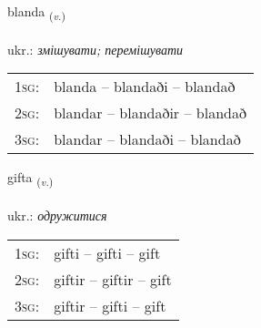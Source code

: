 \documentclass[frontgrid, backgrid]{flacards}\usepackage[]{graphicx}\usepackage[]{xcolor}
\begin{document}
\renewcommand{\blhead}{\vskip5pt {\small\bfseries\footnotesize Sagnorð | дієслово }}
\renewcommand{\bcfoot}{\vskip5pt \hspace{2pt}{\small\bfseries\footnotesize 2K}}


{blanda \small{\textsubscript{(\textit{v.})}} \\[1ex] %
\textphonetic{[planta]} \\
ukr.: \emph{змішувати; перемішувати} \\  [2ex]
\renewcommand*{\arraystretch}{0.8}
\begin{tabular}{p{1cm}l}
\textsc{1sg}: & blanda -- blandaði -- blandað \\ 
\textsc{2sg}: & blandar -- blandaðir -- blandað \\ 
\textsc{3sg}: & blandar -- blandaði -- blandað \\ 
\end{tabular}
}

\renewcommand{\flhead}{\vskip5pt \fboxsep=0pt {\small\bfseries\footnotesize Sagnorð | дієслово}}
\renewcommand{\fcfoot}{\vskip5pt \fboxsep=0pt \hspace{2pt}{\small\bfseries\footnotesize 2K}}

\renewcommand{\blhead}{\vskip5pt {\small\bfseries\footnotesize Sagnorð | дієслово }}
\renewcommand{\bcfoot}{\vskip5pt \hspace{2pt}{\small\bfseries\footnotesize 2K}}


{gifta \small{\textsubscript{(\textit{v.})}} \\[1ex] %
\textphonetic{[cɪfta]} \\
ukr.: \emph{одружитися} \\  [2ex]
\renewcommand*{\arraystretch}{0.8}
\begin{tabular}{p{1cm}l}
\textsc{1sg}: & gifti -- gifti -- gift \\ 
\textsc{2sg}: & giftir -- giftir -- gift \\ 
\textsc{3sg}: & giftir -- gifti -- gift \\ 
\end{tabular}
}
\end{document}
